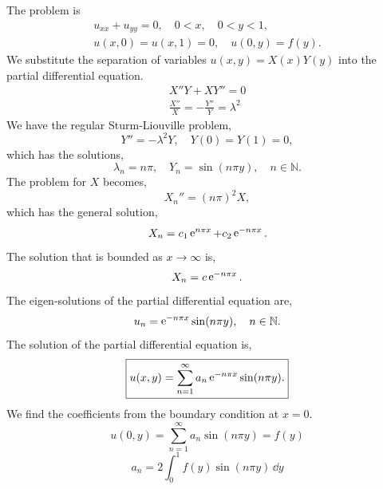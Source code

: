 {%
\begin{Solution}
  \label{solution heat semi-infinite rectangular slab}
  The problem is
  \begin{gather*}
    u_{x x} + u_{y y} = 0, \quad 0 < x, \quad 0 < y < 1, \\
    u(x,0) = u(x,1) = 0, \quad u(0,y) = f(y).
  \end{gather*}
  We substitute the separation of variables $u(x,y) = X(x) Y(y)$ into the 
  partial differential equation.
  \begin{gather*}
    X'' Y + X Y'' = 0 \\
    \frac{X''}{X} = - \frac{Y''}{Y} = \lambda^2
  \end{gather*}
  We have the regular Sturm-Liouville problem,
  \[
  Y'' = - \lambda^2 Y, \quad Y(0) = Y(1) = 0,
  \]
  which has the solutions,
  \[
  \lambda_n = n \pi, \quad
  Y_n = \sin(n \pi y), \quad
  n \in \mathbb{N}.
  \]
  The problem for $X$ becomes,
  \[
  X_n'' = (n \pi)^2 X,
  \]
  which has the general solution,
  \[
  X_n = c_1 \mathop{\mathrm{e}}\nolimits^{n \pi x} + c_2 \mathop{\mathrm{e}}\nolimits^{-n \pi x}.
  \]
  The solution that is bounded as $x \to \infty$ is,
  \[
  X_n = c \mathop{\mathrm{e}}\nolimits^{-n \pi x}.
  \]
  The eigen-solutions of the partial differential equation are,
  \[
  u_n = \mathop{\mathrm{e}}\nolimits^{-n \pi x} \sin(n \pi y), \quad
  n \in \mathbb{N}.
  \]
  The solution of the partial differential equation is,
  \[
  \boxed{
    u(x,y) = \sum_{n=1}^\infty a_n \mathop{\mathrm{e}}\nolimits^{-n \pi x} \sin(n \pi y).
    }
  \]
  We find the coefficients from the boundary condition at $x = 0$.
  \[
  u(0,y) = \sum_{n=1}^\infty a_n \sin(n \pi y) = f(y)
  \]
  \[
  \boxed{
    a_n = 2 \int_0^1 f(y) \sin(n \pi y) \,\dd y
    }
  \]
\end{Solution}



}
